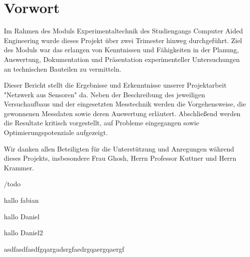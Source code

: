 
\chapter*{Vorwort}
\thispagestyle{empty} %
\todo{}

Im Rahmen des Moduls Experimentaltechnik des Studiengangs Computer Aided Engineering wurde dieses Projekt über zwei Trimester hinweg durchgeführt.
Ziel des Moduls war das erlangen von Kenntnissen und Fähigkeiten in der Planung, Auswertung, Dokumentation und Präsentation experimenteller Untersuchungen an technischen Bauteilen zu vermitteln.

Dieser Bericht stellt die Ergebnisse und Erkenntnisse unserer Projektarbeit "Netzwerk aus Sensoren" da. Neben der Beschreibung des jeweiligen Versuchaufbaus und der eingesetzten Messtechnik  werden die Vorgehensweise, die gewonnenen Messdaten sowie deren Auswertung erläutert. Abschließend werden die Resultate kritisch vorgestellt, auf Probleme eingegangen sowie Optimierungspotenziale aufgezeigt.

Wir danken allen Beteiligten für die Unterstützung und Anregungen während dieses Projekts, insbesondere Frau Ghosh, Herrn Professor Kuttner und Herrn Krammer.



/todo{}

hallo fabian

hallo Daniel

hallo Daniel2

asdfasdfasdfgqargadsrgfaedrgqaergqaergf